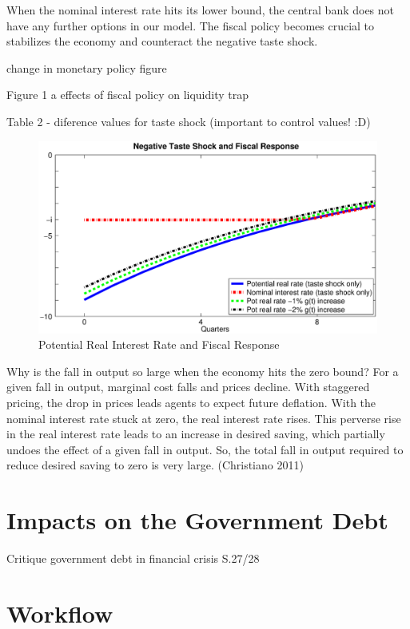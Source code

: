 \documentclass[12pt,a4paper,oneside,titlepage]{article}
\begin{document}
When the nominal interest rate hits its lower bound, the central bank does not have any further options in our model. The fiscal policy becomes crucial to stabilizes the economy and counteract the negative taste shock.

change in monetary policy figure

Figure 1 a effects of fiscal policy on liquidity trap

Table 2 - diference values for taste shock (important to control values! :D)

\begin{figure}[p]
\includegraphics[width=\textwidth]{Paperpics/Figure1a}
\caption{Potential Real Interest Rate and Fiscal Response}
\label{Figure1a}
\end{figure}

Why is the fall in output so large when the economy hits the zero
bound? For a given fall in output, marginal cost falls and prices decline.
With staggered pricing, the drop in prices leads agents to expect future deflation. With the nominal interest rate stuck at zero, the real interest
rate rises. This perverse rise in the real interest rate leads to an increase
in desired saving, which partially undoes the effect of a given fall in
output. So, the total fall in output required to reduce desired saving to
zero is very large. (Christiano 2011)



\section{Impacts on the Government Debt}

\citet{Afonso.2010}
Critique government debt in financial crisis S.27/28

\section{Workflow}
\end{document}
